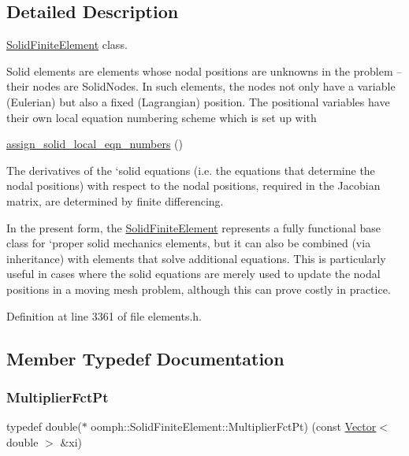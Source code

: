 \subsection{Detailed Description}
\hyperlink{classoomph_1_1SolidFiniteElement}{Solid\+Finite\+Element} class. 

Solid elements are elements whose nodal positions are unknowns in the problem -- their nodes are Solid\+Nodes. In such elements, the nodes not only have a variable (Eulerian) but also a fixed (Lagrangian) position. The positional variables have their own local equation numbering scheme which is set up with 
\begin{DoxyCode}
\hyperlink{classoomph_1_1SolidFiniteElement_a3c7ad30f234e87649ed34cea94f65ea3}{assign\_solid\_local\_eqn\_numbers} () 
\end{DoxyCode}
 The derivatives of the `solid equations\textquotesingle{} (i.\+e. the equations that determine the nodal positions) with respect to the nodal positions, required in the Jacobian matrix, are determined by finite differencing.

In the present form, the \hyperlink{classoomph_1_1SolidFiniteElement}{Solid\+Finite\+Element} represents a fully functional base class for `proper\textquotesingle{} solid mechanics elements, but it can also be combined (via inheritance) with elements that solve additional equations. This is particularly useful in cases where the solid equations are merely used to update the nodal positions in a moving mesh problem, although this can prove costly in practice. 

Definition at line 3361 of file elements.\+h.



\subsection{Member Typedef Documentation}
\mbox{\label{classoomph_1_1SolidFiniteElement_a1ec1cdf98041a51f77aab2b892856fc4}} 
\subsubsection{\texorpdfstring{Multiplier\+Fct\+Pt}{MultiplierFctPt}}
{\footnotesize\ttfamily typedef double($\ast$ oomph\+::\+Solid\+Finite\+Element\+::\+Multiplier\+Fct\+Pt) (const \hyperlink{classoomph_1_1Vector}{Vector}$<$ double $>$ \&xi)}



